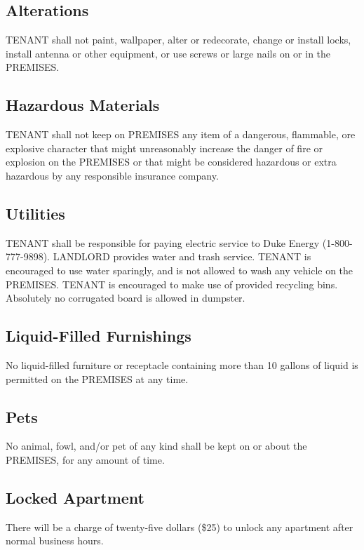 \documentclass[11pt]{article}
\begin{document}
\subsection*{Alterations}
\label{sec:orgc2ffafa}
TENANT shall not paint, wallpaper, alter or redecorate, change or
install locks, install antenna or other equipment, or use screws or
large nails on or in the PREMISES.

\subsection*{Hazardous Materials}
\label{sec:org36f1b75}
TENANT shall not keep on PREMISES any item of a dangerous, flammable,
ore explosive character that might unreasonably increase the danger of
fire or explosion on the PREMISES or that might be considered
hazardous or extra hazardous by any responsible insurance company.

\subsection*{Utilities}
\label{sec:orge8a819c}
TENANT shall be responsible for paying electric service to Duke Energy
(1-800-777-9898).  LANDLORD provides water and trash service.  TENANT
is encouraged to use water sparingly, and is not allowed to wash any
vehicle on the PREMISES.  TENANT is encouraged to make use of provided
recycling bins.  Absolutely no corrugated board is allowed in
dumpster.

\subsection*{Liquid-Filled Furnishings}
\label{sec:org9e8fc67}
No liquid-filled furniture or receptacle containing more than 10 gallons
of liquid is permitted on the PREMISES at any time.

\subsection*{Pets}
\label{sec:org877e7e6}
No animal, fowl, and/or pet of any kind shall be kept on or about the
PREMISES, for any amount of time.

\subsection*{Locked Apartment}
\label{sec:org63561e7}
There will be a charge of twenty-five dollars (\$25) to unlock any
apartment after normal business hours.
\end{document}
